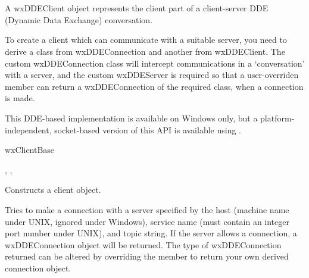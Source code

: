 \section{}\label{wxddeclient}

A wxDDEClient object represents the client part of a client-server DDE
(Dynamic Data Exchange) conversation.

To create a client which can communicate with a suitable server,
you need to derive a class from wxDDEConnection and another from wxDDEClient.
The custom wxDDEConnection class will intercept communications in
a `conversation' with a server, and the custom wxDDEServer is required
so that a user-overriden  member can return
a wxDDEConnection of the required class, when a connection is made.

This DDE-based implementation is
available on Windows only, but a platform-independent, socket-based version
of this API is available using .


wxClientBase\\


, , 




Constructs a client object.

\label{wxddeclientmakeconnection}


Tries to make a connection with a server specified by the host
(machine name under UNIX, ignored under Windows), service name (must
contain an integer port number under UNIX), and topic string. If the
server allows a connection, a wxDDEConnection object will be returned.
The type of wxDDEConnection returned can be altered by overriding
the  member to return your own
derived connection object.

